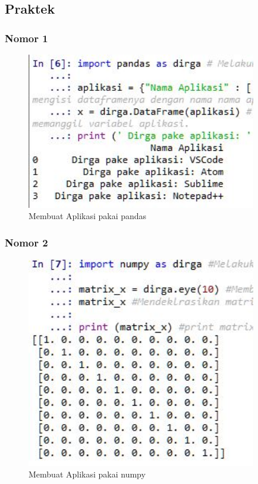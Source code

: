 \subsection{Praktek}
\subsubsection{Nomor 1}
\hfill\break

\begin{figure}[H]
\centerline{\includegraphics[width=10cm]{figures/1174074/3/4.jpg}}
\caption{Membuat Aplikasi pakai pandas}
\label{labelgambar}
\end{figure}

\subsubsection{Nomor 2}
\hfill\break

\begin{figure}[H]
\centerline{\includegraphics[width=10cm]{figures/1174074/3/5.jpg}}
\caption{Membuat Aplikasi pakai numpy}
\label{labelgambar}
\end{figure}

